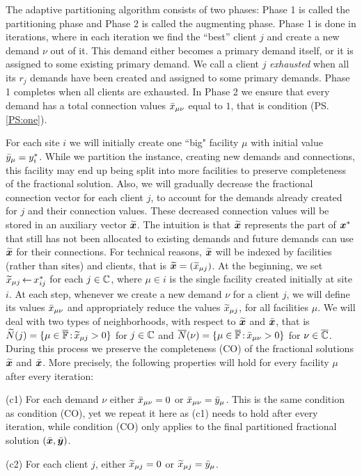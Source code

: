 \documentclass[oneside,final]{ucr}
\begin{document}
The adaptive partitioning algorithm consists of two phases:
Phase 1 is called the partitioning phase and Phase 2 is called
the augmenting phase. Phase 1 is done in iterations, where
in each iteration we find the ``best'' client $j$ and create a
new demand $\nu$ out of it. This demand either becomes a
primary demand itself, or it is assigned to some existing
primary demand. We call a client $j$ \emph{exhausted} when
all its $r_j$ demands have been created and assigned to some
primary demands. Phase 1 completes when all clients are
exhausted. In Phase 2 we ensure that every demand has a
total connection values ${\bar x}_{\mu\nu}$ equal to $1$, that is condition (PS.\ref{PS:one}).

For each site $i$ we will initially create one ``big" facility $\mu$
with initial value ${\bar y}_\mu = y^\ast_i$.  While we partition the
instance, creating new demands and connections, this facility may end
up being split into more facilities to preserve completeness of the
fractional solution. Also, we will gradually decrease the fractional
connection vector for each client $j$, to account for the demands
already created for $j$ and their connection values.  These decreased
connection values will be stored in an auxiliary vector
$\widetilde{\boldsymbol{x}}$. The intuition is that $\widetilde{\boldsymbol{x}}$ represents the part of
$\boldsymbol{x}^\ast$ that still has not been allocated to existing demands and
future demands can use $\widetilde{\boldsymbol{x}}$ for their connections. For
technical reasons, $\widetilde{\boldsymbol{x}}$ will be indexed by facilities (rather
than sites) and clients, that is $\widetilde{\boldsymbol{x}} = ({\widetilde x}_{\mu j})$.  At
the beginning, we set ${\widetilde x}_{\mu j}{\,\leftarrow\,} x_{ij}^\ast$ for each
$j\in\mathbb{C}$, where $\mu\in i$ is the single facility created
initially at site $i$.  At each step, whenever we create a new demand
$\nu$ for a client $j$, we will define its values ${\bar x}_{\mu\nu}$ and
appropriately reduce the values ${\widetilde x}_{\mu j}$, for all facilities
$\mu$. We will deal with two types of neighborhoods, with respect to
$\widetilde{\boldsymbol{x}}$ and $\bar{\boldsymbol{x}}$, that is ${\widetilde N}(j)=\{\mu\in\overline{\mathbb{F}}
{\,:\,}{\widetilde x}_{\mu j} > 0\}$ for $j\in\mathbb{C}$ and
${\overline{N}}(\nu)=\{\mu\in\overline{\mathbb{F}} {\,:\,} {\bar x}_{\mu\nu} >0\}$ for
$\nu\in\overline{\mathbb{C}}$.  During this process we preserve the completeness
(CO) of the fractional solutions $\widetilde{\boldsymbol{x}}$ and $\bar{\boldsymbol{x}}$. More
precisely, the following properties will hold for every facility $\mu$
after every iteration:
%
\begin{description}
	
	\item{(c1)} For each demand $\nu$ either ${\bar x}_{\mu\nu}=0$ or
			${\bar x}_{\mu\nu}={\bar y}_{\mu}$. This is the same
      condition as condition (CO), yet we repeat it here as
      (c1) needs to hold after every iteration, while
      condition (CO) only applies to the final partitioned
      fractional solution $(\bar{\boldsymbol{x}}, \bar{\boldsymbol{y}})$.

	\item{(c2)} For each client $j$,
			either ${\widetilde x}_{\mu j}=0$ or ${\widetilde x}_{\mu j}={\bar y}_{\mu}$.
			
\end{description}
\end{document}
